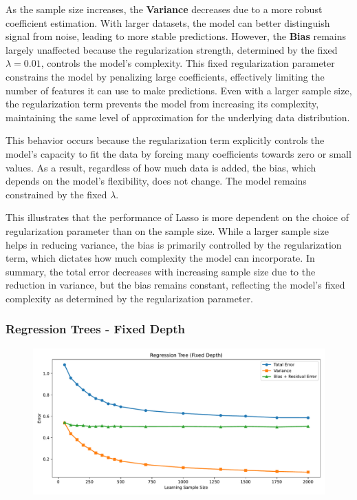 \documentclass[a4paper,10pt]{article}
\begin{document}
As the sample size increases, the \textbf{Variance} decreases due to a more robust coefficient estimation. With larger datasets, the model can better distinguish signal from noise, leading to more stable predictions. However, the \textbf{Bias} remains largely unaffected because the regularization strength, determined by the fixed \(\lambda = 0.01\), controls the model's complexity. This fixed regularization parameter constrains the model by penalizing large coefficients, effectively limiting the number of features it can use to make predictions. Even with a larger sample size, the regularization term prevents the model from increasing its complexity, maintaining the same level of approximation for the underlying data distribution. 

This behavior occurs because the regularization term explicitly controls the model's capacity to fit the data by forcing many coefficients towards zero or small values. As a result, regardless of how much data is added, the bias, which depends on the model's flexibility, does not change. The model remains constrained by the fixed \(\lambda\).

This illustrates that the performance of Lasso is more dependent on the choice of regularization parameter than on the sample size. While a larger sample size helps in reducing variance, the bias is primarily controlled by the regularization term, which dictates how much complexity the model can incorporate. In summary, the total error decreases with increasing sample size due to the reduction in variance, but the bias remains constant, reflecting the model's fixed complexity as determined by the regularization parameter.



\subsubsection{Regression Trees - Fixed Depth}

\begin{figure}[H]
    \centering
    \includegraphics[width=0.8\linewidth]{images/2.4_rt_fixed.pdf}
\end{figure}
\end{document}
